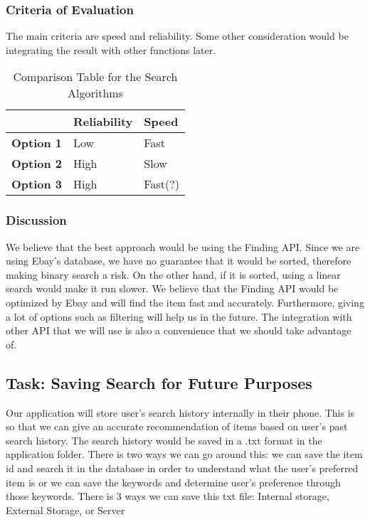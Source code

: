 \documentclass[journal,compsoc, 10pt, draftclsnofoot, onecolumn]{IEEEtran}
\begin{document}
\subsubsection{Criteria of Evaluation}
The main criteria are speed and reliability. Some other consideration would be integrating the result with other functions later.

\begin{table}[h]
	\centering
	\caption{Comparison Table for the Search Algorithms}
	\label{Comparison Table for the Search Algorithm}
	\begin{tabularx}{\textwidth}{|X|X|X|}
		\hline
		\textbf{}         & \textbf{Reliability}                & \textbf{Speed} 
		\\ \hline
		\textbf{Option 1} & Low & Fast
		\\ \hline
		\textbf{Option 2} & High & Slow                                                                                       
		\\ \hline
		\textbf{Option 3} & High &Fast(?)                                                               
		\\ \hline
	\end{tabularx}
\end{table}

\subsubsection{Discussion}
  We believe that the best approach would be using the Finding API. Since we are using Ebay’s database, we have no guarantee that it would be sorted, therefore making binary search a risk. On the other hand, if it is sorted, using a linear search would make it run slower. We believe that the Finding API would be optimized by Ebay and will find the item fast and accurately. Furthermore, giving a lot of options such as filtering will help us in the future. The integration with other API that we will use is also a convenience that we should take advantage of. 
  
\subsection{Task: Saving Search for Future Purposes}
Our application will store user’s search history internally in their phone. This is so that we can give an accurate recommendation of items based on user’s past search history. The search history would be saved in a .txt format in the application folder. There is two ways we can go around this: we can save the item id and search it in the database in order to understand what the user’s preferred item is or we can save the keywords and determine user’s preference through those keywords. 
There is 3 ways we can save this txt file: Internal storage, External Storage, or Server
\end{document}
